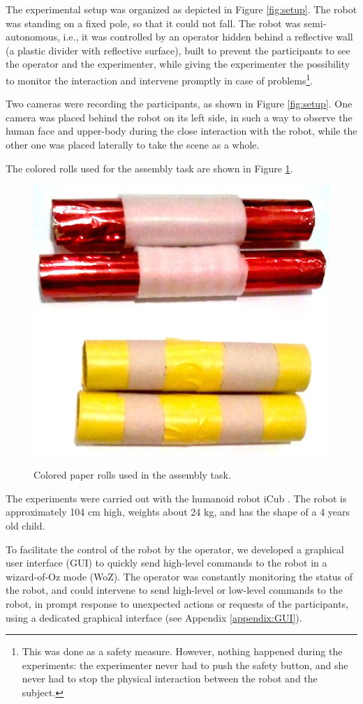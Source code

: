 The experimental setup was organized as depicted in Figure \ref{fig:setup}. 
The robot was standing on a fixed pole, so that it could not fall.
The robot was semi-autonomous, i.e., it was controlled by an operator hidden behind 
a reflective wall (a plastic divider with reflective surface), built  
to prevent the participants to see the operator and the experimenter, while giving the experimenter the possibility to monitor the interaction and intervene promptly in case of problems\footnote{This was done as a safety measure. However, nothing happened during the experiments: the experimenter never had to push the safety button, and she never had to stop the physical interaction between the robot and the subject.}. 

Two cameras were recording the participants, as shown in Figure \ref{fig:setup}. 
One camera was placed behind the robot on its left side, in such a way to observe the human face and upper-body during the close interaction with the robot, while the other one was placed laterally to take the scene as a whole.


The colored rolls used for the assembly task are shown in Figure \ref{fig:rolls}.

\begin{figure}[ht!]
\centering
{
\includegraphics[width=0.4\hsize]{Serena/figures/tubes.jpg}
}
\caption{Colored paper rolls used in the assembly task.}
\label{fig:rolls}
\end{figure}



The experiments were carried out with the humanoid robot iCub \cite{icub2013}. The robot is approximately 104 cm high, weights about 24 kg, and has the shape of a 4 years old child. 


To facilitate the control of the robot by the operator, we developed a graphical user interface (GUI) to quickly send high-level commands to the robot in a wizard-of-Oz mode (WoZ). 
The operator was constantly monitoring the status of the robot, and could intervene to send high-level or low-level commands to the robot, in prompt response to unexpected actions or requests of the participants, using a dedicated graphical interface (see Appendix \ref{appendix:GUI}).

